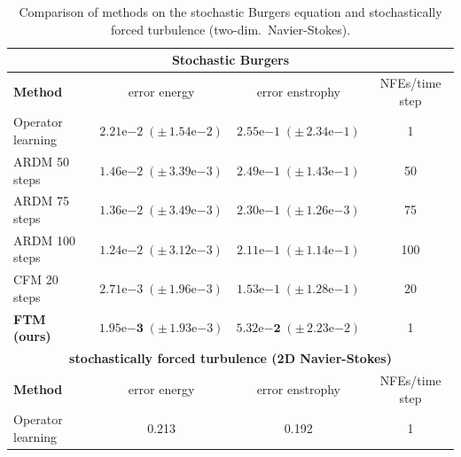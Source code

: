 \documentclass[oneside,11pt]{article}
\theoremstyle{remark}
\begin{document}
\begin{table}
\centering\small
\caption{Comparison of methods on the stochastic Burgers equation and stochastically forced turbulence (two-dim.\ Navier-Stokes).}
\label{tab:burgers_jaxcfd}
\begin{tabular}{lccc}
\toprule
\multicolumn{4}{c}{\textbf{Stochastic Burgers}} \\
\midrule
\textbf{Method} & error energy & error enstrophy & NFEs/time step \\
\midrule
Operator learning \cite{stachenfeld2021learned} 
& $2.21\mathrm{e}{-2}\;(\pm\,1.54\mathrm{e}{-2})$ 
& $2.55\mathrm{e}{-1}\;(\pm\,2.34\mathrm{e}{-1})$ 
& 1 \\






ARDM 50 steps\cite{KOHL2026108641} 
& $1.46\mathrm{e}{-2}\;(\pm\,3.39\mathrm{e}{-3})$ 
& $2.49\mathrm{e}{-1}\;(\pm\,1.43\mathrm{e}{-1})$ 
& 50 \\

ARDM 75 steps \cite{KOHL2026108641} 
& $1.36\mathrm{e}{-2}\;(\pm\,3.49\mathrm{e}{-3})$ 
& $2.30\mathrm{e}{-1}\;(\pm\,1.26\mathrm{e}{-3})$ 
& 75 \\

ARDM 100 steps \cite{KOHL2026108641} 
& $1.24\mathrm{e}{-2}\;(\pm\,3.12\mathrm{e}{-3})$  
& $2.11\mathrm{e}{-1}\;(\pm\,1.14\mathrm{e}{-1})$  
& 100 \\
CFM 20 steps \cite{albergo-vanden-eijnden:2022,lipman2023flow} & $2.71\mathrm{e}{-3}\;(\pm\,1.96\mathrm{e}{-3})$ 
& $1.53\mathrm{e}{-1}\;(\pm\,1.28\mathrm{e}{-1})$ 
& 20 \\















\textbf{FTM (ours)} 
& $\mathbf{1.95\mathrm{e}{-3}}\;(\pm\,1.93\mathrm{e}{-3})$ 
& $\mathbf{5.32\mathrm{e}{-2}}\;(\pm\,2.23\mathrm{e}{-2})$ 
& 1 \\

\midrule
\multicolumn{4}{c}{\textbf{stochastically forced turbulence (2D Navier-Stokes)}} \\
\midrule
\textbf{Method} & error energy & error enstrophy & NFEs/time step \\
\midrule
Operator learning \cite{stachenfeld2021learned} 
& 0.213 
& 0.192 
& 1 \\







\end{tabular}
\end{table}
\end{document}

